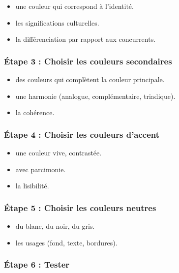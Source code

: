 \begin{itemize}
    \item {} une couleur qui correspond à l'identité.
    \item {} les significations culturelles.
    \item {} la différenciation par rapport aux concurrents.
\end{itemize}

\subsubsection{Étape 3 : Choisir les couleurs secondaires}

\begin{itemize}
    \item {} des couleurs qui complètent la couleur principale.
    \item {} une harmonie (analogue, complémentaire, triadique).
    \item {} la cohérence.
\end{itemize}

\subsubsection{Étape 4 : Choisir les couleurs d'accent}

\begin{itemize}
    \item {} une couleur vive, contrastée.
    \item {} avec parcimonie.
    \item {} la lisibilité.
\end{itemize}

\subsubsection{Étape 5 : Choisir les couleurs neutres}

\begin{itemize}
    \item {} du blanc, du noir, du gris.
    \item {} les usages (fond, texte, bordures).
\end{itemize}

\subsubsection{Étape 6 : Tester}

